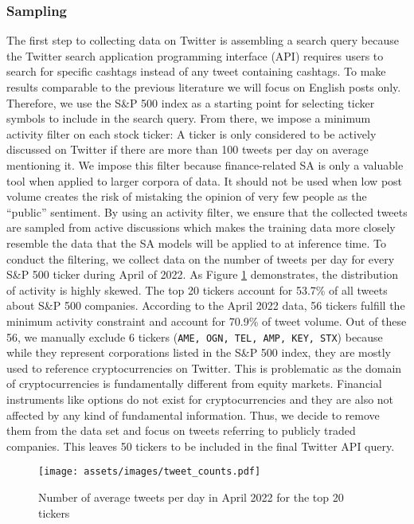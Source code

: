\subsubsection{Sampling}
\label{section-sampling}
The first step to collecting data on Twitter is assembling a search query because the Twitter search application programming interface (API) requires users to search for specific cashtags instead of any tweet containing cashtags. To make results comparable to the previous literature we will focus on English posts only. Therefore, we use the S\&P 500 index as a starting point for selecting ticker symbols to include in the search query. From there, we impose a minimum activity filter on each stock ticker: A ticker is only considered to be actively discussed on Twitter if there are more than 100 tweets per day on average mentioning it. We impose this filter because finance-related SA is only a valuable tool when applied to larger corpora of data. It should not be used when low post volume creates the risk of mistaking the opinion of very few people as the ``public'' sentiment. By using an activity filter, we ensure that the collected tweets are sampled from active discussions which makes the training data more closely resemble the data that the SA models will be applied to at inference time. To conduct the filtering, we collect data on the number of tweets per day for every S\&P 500 ticker during April of 2022. As Figure \ref{figure-tweet-activity} demonstrates, the distribution of activity is highly skewed. The top 20 tickers account for 53.7\% of all tweets about S\&P 500 companies. According to the April 2022 data, 56 tickers fulfill the minimum activity constraint and account for 70.9\% of tweet volume. Out of these 56, we manually exclude 6 tickers (\texttt{AME, OGN, TEL, AMP, KEY, STX}) because while they represent corporations listed in the S\&P 500 index, they are mostly used to reference cryptocurrencies on Twitter. This is problematic as the domain of cryptocurrencies is fundamentally different from equity markets. Financial instruments like options do not exist for cryptocurrencies and they are also not affected by any kind of fundamental information. Thus, we decide to remove them from the data set and focus on tweets referring to publicly traded companies. This leaves 50 tickers to be included in the final Twitter API query.

\begin{figure}[!ht]
	\texttt{[image: assets/images/tweet\_counts.pdf]}
	\caption{Number of average tweets per day in April 2022 for the top 20 tickers}
	\label{figure-tweet-activity}
\end{figure}


